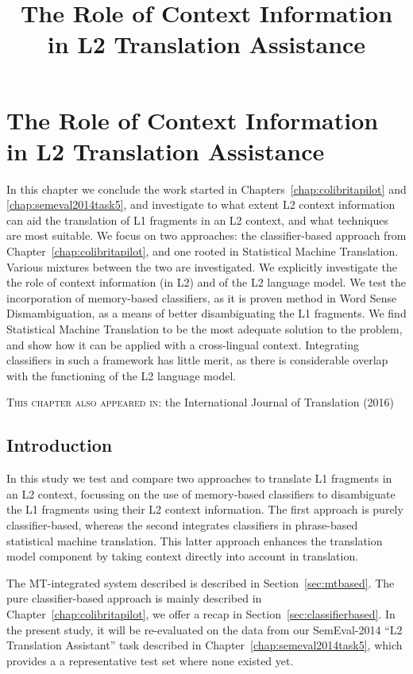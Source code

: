
\chapter{The Role of Context Information in L2 Translation Assistance}
\title{The Role of Context Information in L2 Translation Assistance}
\label{chap:colibritafinal}



In this chapter we conclude the work started in
Chapters~\ref{chap:colibritapilot} and \ref{chap:semeval2014task5}, and
investigate to what extent L2 context information can aid the translation of L1
fragments in an L2 context, and what techniques are most suitable. We focus on
two approaches: the classifier-based approach from
Chapter~\ref{chap:colibritapilot}, and one rooted in Statistical
Machine Translation.  Various mixtures between the two are investigated. We
explicitly investigate the the role of context information (in L2) and of the
L2 language model. We test the incorporation of memory-based classifiers, as it
is proven method in Word Sense Dismambiguation, as a means of better
disambiguating the L1 fragments.  We find Statistical Machine Translation to be
the most adequate solution to the problem, and show how it can be applied with
a cross-lingual context. Integrating classifiers in such a framework has
little merit, as there is considerable overlap with the functioning of the L2
language model.

\textsc{This chapter also appeared in:} the International Journal of Translation (2016)

\section{Introduction}

In this study we test and compare two approaches to translate L1 fragments in
an L2 context, focussing on the use of memory-based classifiers to disambiguate
the L1 fragments using their L2 context information. The first approach is
purely classifier-based, whereas the second integrates classifiers in
phrase-based statistical machine translation. This latter approach enhances the
translation model component by taking context directly into account in
translation.

The MT-integrated system described is described in Section~\ref{sec:mtbased}.
The pure classifier-based approach is mainly described in
Chapter~\ref{chap:colibritapilot}, we offer a recap in
Section~\ref{sec:classifierbased}. In the present study, it will be re-evaluated on the
data from our SemEval-2014 ``L2 Translation Assistant'' task
described in Chapter~\ref{chap:semeval2014task5}, which provides a
a representative test set where none existed yet.

